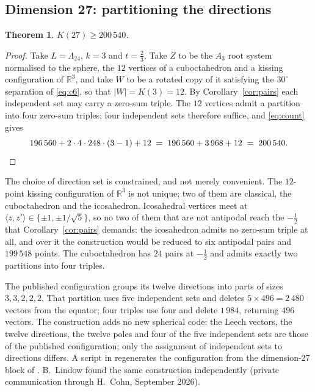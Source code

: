 \documentclass[11pt]{amsart}
\newtheorem{theorem}{Theorem}[section]
\theoremstyle{remark}
\newcommand{\Leech}{\Lambda_{24}}
\newcommand{\ip}[2]{\langle #1,#2\rangle}
\newcommand{\R}{\mathbb{R}}
\begin{document}
\subsection{Dimension 27: partitioning the directions}\label{ss:d27}

\begin{theorem}\label{thm:27}
$K(27)\ge200\,540$.
\end{theorem}

\begin{proof}
Take $L=\Leech$, $k=3$ and $t=\tfrac23$. Take $Z$ to be the $A_3$ root system
normalised to the sphere, the $12$ vertices of a cuboctahedron and a kissing
configuration of $\R^3$, and take $W$ to be a rotated copy of it satisfying the
$30^\circ$ separation of \eqref{eq:c6}, so that $|W|=K(3)=12$. By
Corollary~\ref{cor:pairs} each independent set may carry a zero-sum triple. The
$12$ vertices admit a partition into four zero-sum triples; four independent sets
therefore suffice, and \eqref{eq:count} gives
\[
  196\,560+2\cdot 4\cdot 248\cdot(3-1)+12
  \;=\;196\,560+3\,968+12\;=\;200\,540 . \qedhere
\]
\end{proof}

The choice of direction set is constrained, and not merely convenient. The
$12$-point kissing configuration of $\R^3$ is not unique; two of them are classical,
the cuboctahedron and the icosahedron. Icosahedral vertices meet at
$\ip{z}{z'}\in\{\pm1,\pm1/\sqrt5\}$, so
no two of them that are not antipodal reach the $-\tfrac12$ that
Corollary~\ref{cor:pairs} demands: the icosahedron admits no zero-sum triple at
all, and over it the construction would be reduced to six antipodal pairs and
$199\,548$ points. The cuboctahedron has $24$ pairs at $-\tfrac12$ and admits
exactly two partitions into four triples.

The published configuration \cite{ma-etal2025} groups its twelve directions into
parts of sizes $3,3,2,2,2$. That partition uses five independent sets and deletes
$5\times496=2\,480$ vectors from the equator; four triples use four and delete
$1\,984$, returning $496$ vectors. The construction adds no new spherical code:
the Leech vectors, the twelve directions, the twelve poles and four of the five
independent sets are those of the published configuration; only the
assignment of independent sets to directions differs. A script in \cite{repo}
regenerates the configuration from the dimension-$27$ block of \cite{cohn-data}.
B.~Lindow found the same construction independently (private communication
through H.~Cohn, September 2026).
\end{document}
